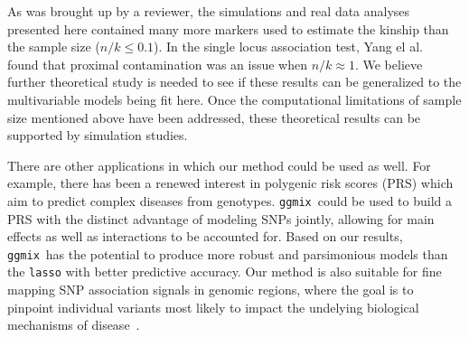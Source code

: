 \documentclass[12pt,letter]{article}\usepackage[]{graphicx}\usepackage[]{color}
\newcommand{\ggmix}{\texttt{ggmix}}
\begin{document}
As was brought up by a reviewer, the simulations and real data analyses presented here contained many more markers used to estimate the kinship than the sample size ($n/k \leq 0.1$). In the single locus association test, Yang el al.~\citep{yang2014advantages} found that proximal contamination was an issue when $n/k \approx 1$. We believe further theoretical study is needed to see if these results can be generalized to the multivariable models being fit here. Once the computational limitations of sample size mentioned above have been addressed, these theoretical results can be supported by simulation studies.




There are other applications in which our method could be used as well.
For example, there has been a renewed interest in polygenic risk scores (PRS) which aim to predict complex diseases from genotypes. 
\ggmix ~could be used to build a PRS with the distinct advantage of modeling SNPs jointly, allowing for main effects as well as interactions to be accounted for. 
Based on our results, \ggmix ~has the potential to produce more robust and parsimonious models than the \texttt{lasso} with better predictive accuracy.
Our method is also suitable for fine mapping SNP association signals in genomic regions, where the goal is to pinpoint individual variants most likely to impact the undelying biological mechanisms of disease~\citep{spain2015strategies}.
\end{document}
